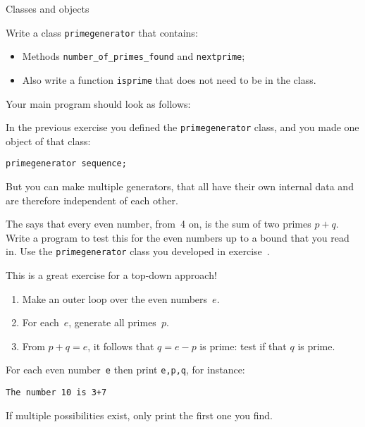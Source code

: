  {Classes and objects}
\label{sec:prime-seq-class}


\begin{comment}
  In exercise~\textbookref{ex:prime:struct} you made a structure that contains
  the data for a prime sequence, and you have separate functions that
  operate on that structure or on its members.
\end{comment}

\begin{exercise}
  \label{ex:prime:sequence}
  Write a class \lstinline{primegenerator} that contains:
  \begin{itemize}
  \item Methods  \lstinline{number_of_primes_found} and \lstinline{nextprime};
  \item Also write a function \lstinline{isprime} that does not need to be
    in the class.
  \end{itemize}

  Your main program should look as follows:
\end{exercise}

In the previous exercise you defined the \lstinline{primegenerator} class, and
you made one object of that class:
\begin{lstlisting}
primegenerator sequence;
\end{lstlisting}
But you can make multiple generators, that all have their own internal
data and are therefore independent of each other.

\begin{exercise}
  \label{ex:goldbach:conj}
  The  says that every even number,
  from~4 on, is the sum of two primes $p+q$. Write a program to test this
  for the even numbers up to a bound that you read in.
  Use the \lstinline{primegenerator} class you developed in exercise~.

  This is a great exercise for a top-down approach!
  \begin{enumerate}
  \item
    Make an outer loop over the even numbers~$e$.
  \item For each~$e$, generate all primes~$p$.
  \item From $p+q=e$, it follows that $q=e-p$ is prime: test if
    that $q$ is prime.
  \end{enumerate}
  For each even number~\lstinline{e} then print \lstinline{e,p,q}, for instance:
  \begin{verbatim}
The number 10 is 3+7
  \end{verbatim}
  If multiple possibilities exist, only print the first one you find.
\end{exercise}

